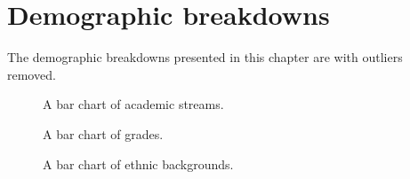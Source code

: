 \chapter{Demographic breakdowns}
The demographic breakdowns presented in this chapter are with outliers removed.

\begin{figure}[H]
	\caption{A bar chart of academic streams.}
	\label{fig:streamBarPlot}
\end{figure}

\begin{figure}[H]
	\caption{A bar chart of grades.}
	\label{fig:gradeBarPlot}
\end{figure}

\begin{figure}[H]
	\caption{A bar chart of ethnic backgrounds.}
	\label{fig:backgroundBarPlot}
\end{figure}
